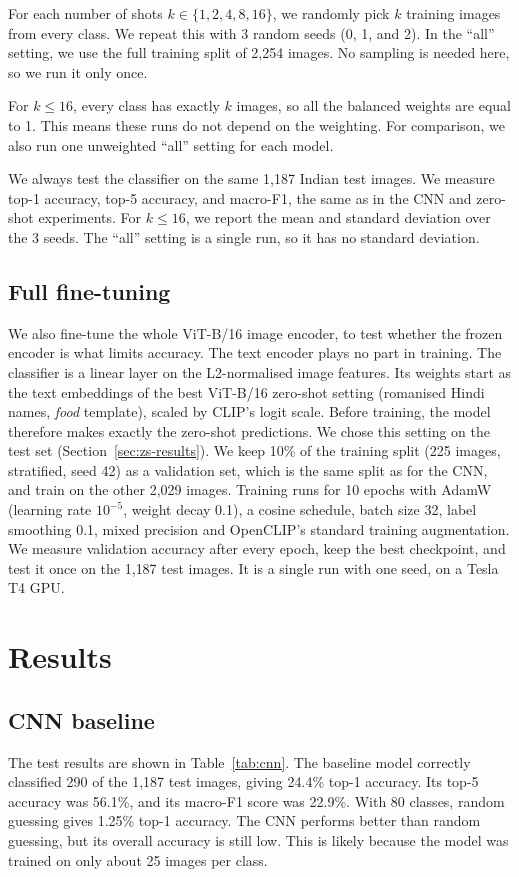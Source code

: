 \documentclass[twoside,a4paper,11pt]{article}
\begin{document}
For each number of shots $k \in \{1, 2, 4, 8, 16\}$, we randomly pick $k$ training images from every class. We repeat this with 3 random seeds (0, 1, and 2). In the ``all'' setting, we use the full training split of 2{,}254 images. No sampling is needed here, so we run it only once.

For $k \le 16$, every class has exactly $k$ images, so all the balanced weights are equal to 1. This means these runs do not depend on the weighting. For comparison, we also run one unweighted ``all'' setting for each model.

We always test the classifier on the same 1{,}187 Indian test images. We measure top-1 accuracy, top-5 accuracy, and macro-F1, the same as in the CNN and zero-shot experiments. For $k \le 16$, we report the mean and standard deviation over the 3 seeds. The ``all'' setting is a single run, so it has no standard deviation.

\subsection{Full fine-tuning}\label{sec:ft-method}  %
We also fine-tune the whole ViT-B/16 image encoder, to test whether the frozen encoder is what limits accuracy. The
text encoder plays no part in training. The classifier is a linear layer on the L2-normalised image features. Its
weights start as the text embeddings of the best ViT-B/16 zero-shot setting (romanised Hindi names, \emph{food}
template), scaled by CLIP's logit scale. Before training, the model therefore makes exactly the zero-shot predictions.
We chose this setting on the test set (Section~\ref{sec:zs-results}). We keep 10\% of the training split (225 images,
stratified, seed 42) as a validation set, which is the same split as for the CNN, and train on the other 2{,}029
images. Training runs for 10 epochs with AdamW (learning rate $10^{-5}$, weight decay 0.1), a cosine schedule, batch
size 32, label smoothing 0.1, mixed precision and OpenCLIP's standard training augmentation. We measure validation
accuracy after every epoch, keep the best checkpoint, and test it once on the 1{,}187 test images. It is a single run
with one seed, on a Tesla T4 GPU.

\section{Results}
\subsection{CNN baseline}          %
The test results are shown in Table~\ref{tab:cnn}. The baseline model correctly classified 290 of the 1{,}187 test images, giving 24.4\% top-1 accuracy. Its top-5 accuracy was 56.1\%, and its macro-F1 score was 22.9\%. With 80 classes, random guessing gives 1.25\% top-1 accuracy. The CNN performs better than random guessing, but its overall accuracy is still low. This is likely because the model was trained on only about 25 images per class.
\end{document}
